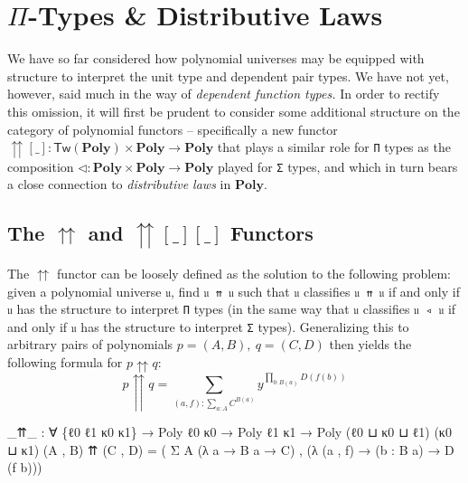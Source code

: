 \documentclass[
  11pt,
  oneside,
  article]{memoir}
\newenvironment{Shaded}{}{}
\newcommand{\NormalTok}[1]{#1}
\newcommand{\OtherTok}[1]{\textcolor[rgb]{0.00,0.44,0.13}{#1}}
\theoremstyle{definition}
\theoremstyle{plain}
\newcommand{\0}{\textsf{0}}
\newcommand{\1}{\tn{\textsf{1}}}
\begin{document}
\chapter{\texorpdfstring{\(\Pi\)-Types \& Distributive
Laws}{\textbackslash Pi-Types \& Distributive Laws}}\label{pi-types-distributive-laws}

We have so far considered how polynomial universes may be equipped with
structure to interpret the unit type and dependent pair types. We have
not yet, however, said much in the way of \emph{dependent function
types.} In order to rectify this omission, it will first be prudent to
consider some additional structure on the category of polynomial
functors -- specifically a new functor
\({\upuparrows}[\_] : \mathsf{Tw}(\mathbf{Poly}) \times \mathbf{Poly} \to \mathbf{Poly}\)
that plays a similar role for \texttt{Π} types as the composition
\(\triangleleft : \mathbf{Poly} \times \mathbf{Poly} \to \mathbf{Poly}\)
played for \texttt{Σ} types, and which in turn bears a close connection
to \emph{distributive laws} in \(\mathbf{Poly}\).

\section{\texorpdfstring{The \(\upuparrows\) and
\({\upuparrows}[\_][\_]\)
Functors}{The \textbackslash upuparrows and \{\textbackslash upuparrows\}{[}\textbackslash\_{]}{[}\textbackslash\_{]} Functors}}\label{the-upuparrows-and-upuparrows__-functors}

The \(\upuparrows\) functor can be loosely defined as the solution to
the following problem: given a polynomial universe \texttt{𝔲}, find
\texttt{𝔲\ ⇈\ 𝔲} such that \texttt{𝔲} classifies \texttt{𝔲\ ⇈\ 𝔲} if and
only if \texttt{𝔲} has the structure to interpret \texttt{Π} types (in
the same way that \texttt{𝔲} classifies \texttt{𝔲\ ◃\ 𝔲} if and only if
\texttt{𝔲} has the structure to interpret \texttt{Σ} types).
Generalizing this to arbitrary pairs of polynomials
\(p = (A , B), ~ q = (C , D)\) then yields the following formula for
\(p \upuparrows q\): \[
p \upuparrows q = \sum_{(a , f) : \sum_{a : A} C^{B(a)}} y^{\prod_{b : B(a)} D(f(b))}
\]

\begin{Shaded}
\begin{Highlighting}[]
\OtherTok{\_}\NormalTok{⇈}\OtherTok{\_} \OtherTok{:} \OtherTok{∀} \OtherTok{\{}\NormalTok{ℓ0 ℓ1 κ0 κ1}\OtherTok{\}} \OtherTok{→}\NormalTok{ Poly ℓ0 κ0 }\OtherTok{→}\NormalTok{ Poly ℓ1 κ1 }
      \OtherTok{→}\NormalTok{ Poly }\OtherTok{(}\NormalTok{ℓ0 ⊔ κ0 ⊔ ℓ1}\OtherTok{)} \OtherTok{(}\NormalTok{κ0 ⊔ κ1}\OtherTok{)}
\OtherTok{(}\NormalTok{A , B}\OtherTok{)}\NormalTok{ ⇈ }\OtherTok{(}\NormalTok{C , D}\OtherTok{)} \OtherTok{=} 
    \OtherTok{(}\NormalTok{ Σ A }\OtherTok{(λ}\NormalTok{ a }\OtherTok{→}\NormalTok{ B a }\OtherTok{→}\NormalTok{ C}\OtherTok{)} 
\NormalTok{    , }\OtherTok{(λ} \OtherTok{(}\NormalTok{a , f}\OtherTok{)} \OtherTok{→} \OtherTok{(}\NormalTok{b }\OtherTok{:}\NormalTok{ B a}\OtherTok{)} \OtherTok{→}\NormalTok{ D }\OtherTok{(}\NormalTok{f b}\OtherTok{)))}
\end{Highlighting}
\end{Shaded}
\end{document}
